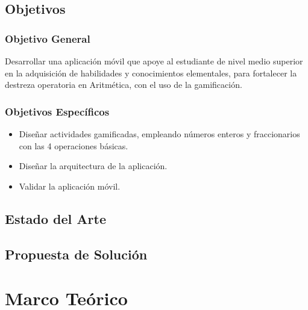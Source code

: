 \documentclass{article}
\begin{document}
\subsection{Objetivos}
\subsubsection{Objetivo General}Desarrollar una aplicación móvil que apoye al estudiante de nivel medio superior en la 
adquisición de habilidades y conocimientos elementales, para fortalecer la destreza 
operatoria en  Aritmética, con el uso de la gamificación.

\subsubsection{Objetivos Específicos}
\begin{itemize}
	\item Diseñar actividades gamificadas, empleando números enteros y fraccionarios con las 4 operaciones básicas.
	\item Diseñar la arquitectura de la aplicación.
	\item Validar la aplicación móvil. 
\end{itemize}
\subsection{Estado del Arte}
\subsection{Propuesta de Solución}
\section{Marco Teórico}
\end{document}
